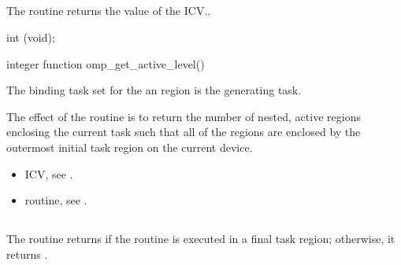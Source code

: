 \subsection{}
\label{subsec:omp_get_active_level}
\summary
The  routine returns the value of the  ICV..

\format
\begin{ccppspecific}
\begin{boxedcode}
int (void);
\end{boxedcode}
\end{ccppspecific}

\pagebreak
\begin{fortranspecific}
\begin{boxedcode}
integer function omp\_get\_active\_level()
\end{boxedcode}
\end{fortranspecific}

\binding
The binding task set for the an  region is the generating 
task. 

\effect
The effect of the  routine is to return the number of nested, 
active  regions enclosing the current task such that all of the  
regions are enclosed by the outermost initial task region on the current device. 

\crossreferences
\begin{itemize}
\item {} ICV, see 
.

\item {} routine, see 
. 
\end{itemize}











\subsection{}
\label{subsec:omp_in_final}
\summary
The  routine returns  if the routine is executed in a final task 
region; otherwise, it returns .


